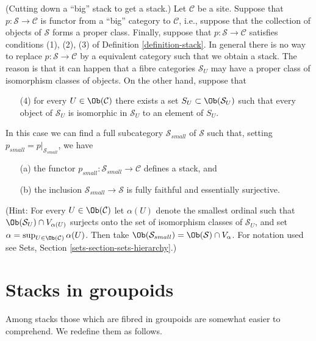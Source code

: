 \begin{remark}
\label{remark-stack-make-small}
(Cutting down a ``big'' stack to get a stack.)
Let $\mathcal{C}$ be a site. Suppose that $p : \mathcal{S} \to \mathcal{C}$
is functor from a ``big'' category to $\mathcal{C}$, i.e., suppose
that the collection of objects of $\mathcal{S}$ forms a proper class.
Finally, suppose that $p : \mathcal{S} \to \mathcal{C}$ satisfies
conditions (1), (2), (3) of
Definition \ref{definition-stack}.
In general there is no way to replace $p : \mathcal{S} \to \mathcal{C}$
by a equivalent category such that we obtain a stack. The reason is that
it can happen that a fibre categories $\mathcal{S}_U$ may have a proper
class of isomorphism classes of objects.
On the other hand, suppose that
\begin{enumerate}
\item[(4)] for every $U \in \Ob(\mathcal{C})$ there exists a set
$S_U \subset \Ob(\mathcal{S}_U)$ such that every object of
$\mathcal{S}_U$ is isomorphic in $\mathcal{S}_U$ to an element of $S_U$.
\end{enumerate}
In this case we can find a full subcategory $\mathcal{S}_{small}$
of $\mathcal{S}$ such that, setting $p_{small} = p|_{\mathcal{S}_{small}}$,
we have
\begin{enumerate}
\item[(a)] the functor $p_{small} : \mathcal{S}_{small} \to \mathcal{C}$
defines a stack, and
\item[(b)] the inclusion $\mathcal{S}_{small} \to \mathcal{S}$
is fully faithful and essentially surjective.
\end{enumerate}
(Hint: For every $U \in \Ob(\mathcal{C})$
let $\alpha(U)$ denote the smallest ordinal such that
$\Ob(\mathcal{S}_U) \cap V_{\alpha(U)}$ surjects onto the set
of isomorphism classes of $\mathcal{S}_U$, and set
$\alpha = \sup_{U \in \Ob(\mathcal{C})} \alpha(U)$.
Then take
$\Ob(\mathcal{S}_{small}) = \Ob(\mathcal{S}) \cap V_\alpha$.
For notation used see Sets, Section \ref{sets-section-sets-hierarchy}.)
\end{remark}







\section{Stacks in groupoids}
\label{section-stacks-in-groupoids}

\noindent
Among stacks those which are fibred in groupoids are somewhat easier
to comprehend. We redefine them as follows.

